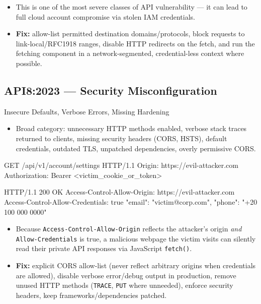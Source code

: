 \documentclass[11pt]{article}
\begin{document}
\begin{itemize}
  \item This is one of the most severe classes of API vulnerability --- it can lead to full cloud account compromise via stolen IAM credentials.
  \item \textbf{Fix:} allow-list permitted destination domains/protocols, block requests to link-local/RFC1918 ranges, disable HTTP redirects on the fetch, and run the fetching component in a network-segmented, credential-less context where possible.
\end{itemize}

\subsection{API8:2023 --- Security Misconfiguration}
\begin{vulnbox}{Insecure Defaults, Verbose Errors, Missing Hardening}
\begin{itemize}
  \item Broad category: unnecessary HTTP methods enabled, verbose stack traces returned to clients, missing security headers (CORS, HSTS), default credentials, outdated TLS, unpatched dependencies, overly permissive CORS.
\end{itemize}
\end{vulnbox}

\begin{httpbox}
GET /api/v1/account/settings HTTP/1.1
Origin: https://evil-attacker.com
Authorization: Bearer <victim_cookie_or_token>

HTTP/1.1 200 OK
Access-Control-Allow-Origin: https://evil-attacker.com
Access-Control-Allow-Credentials: true
{ "email": "victim@corp.com", "phone": "+20 100 000 0000" }
\end{httpbox}

\begin{itemize}
  \item Because \texttt{Access-Control-Allow-Origin} reflects the attacker's origin \textit{and} \texttt{Allow-Credentials} is true, a malicious webpage the victim visits can silently read their private API responses via JavaScript \texttt{fetch()}.
  \item \textbf{Fix:} explicit CORS allow-list (never reflect arbitrary origins when credentials are allowed), disable verbose error/debug output in production, remove unused HTTP methods (\texttt{TRACE}, \texttt{PUT} where unneeded), enforce security headers, keep frameworks/dependencies patched.
\end{itemize}
\end{document}
